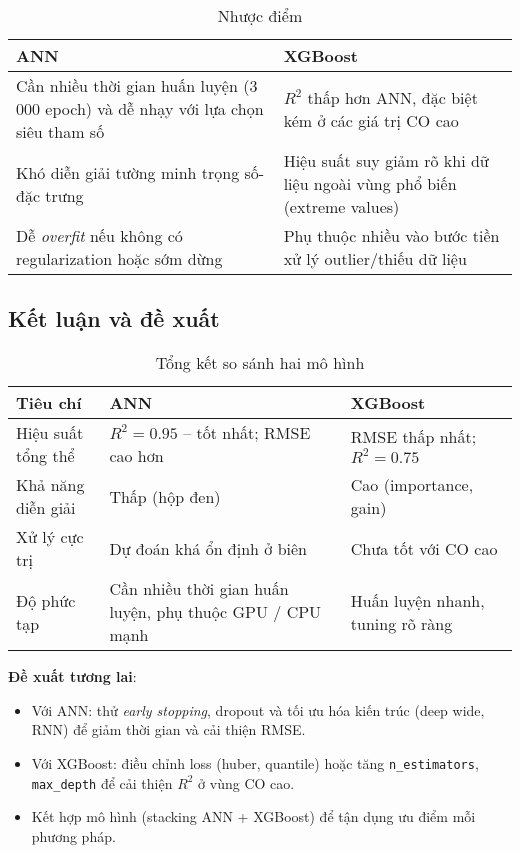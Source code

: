 \begin{table}[h]
\centering
\caption{Nhược điểm}
\begin{tabular}{p{7cm}|p{7cm}}
\toprule
\textbf{ANN} & \textbf{XGBoost} \\
\midrule
Cần nhiều thời gian huấn luyện (3 000 epoch) và dễ nhạy với lựa chọn siêu tham số & $R^{2}$ thấp hơn ANN, đặc biệt kém ở các giá trị CO cao \\
\midrule
Khó diễn giải tường minh trọng số-đặc trưng & Hiệu suất suy giảm rõ khi dữ liệu ngoài vùng phổ biến (extreme values) \\
\midrule
Dễ \emph{overfit} nếu không có regularization hoặc sớm dừng & Phụ thuộc nhiều vào bước tiền xử lý outlier/thiếu dữ liệu \\
\bottomrule
\end{tabular}
\end{table}

\subsection{Kết luận và đề xuất}

\begin{table}[H]
\centering
\caption{Tổng kết so sánh hai mô hình}
\begin{tabular}{p{3cm}|p{5.5cm}|p{5.5cm}}
\toprule
\textbf{Tiêu chí} & \textbf{ANN} & \textbf{XGBoost} \\
\midrule
Hiệu suất tổng thể & $R^{2}=0.95$ – tốt nhất; RMSE cao hơn & RMSE thấp nhất; $R^{2}=0.75$ \\
\midrule
Khả năng diễn giải & Thấp (hộp đen) & Cao (importance, gain) \\
\midrule
Xử lý cực trị & Dự đoán khá ổn định ở biên & Chưa tốt với CO cao \\
\midrule
Độ phức tạp & Cần nhiều thời gian huấn luyện, phụ thuộc GPU / CPU mạnh & Huấn luyện nhanh, tuning rõ ràng \\
\bottomrule
\end{tabular}
\end{table}

\textbf{Đề xuất tương lai}:
\begin{itemize}
  \item Với ANN: thử \emph{early stopping}, dropout và tối ưu hóa kiến trúc (deep wide, RNN) để giảm thời gian và cải thiện RMSE.
  \item Với XGBoost: điều chỉnh loss (huber, quantile) hoặc tăng \texttt{n\_estimators}, \texttt{max\_depth} để cải thiện $R^{2}$ ở vùng CO cao.
  \item Kết hợp mô hình (stacking ANN + XGBoost) để tận dụng ưu điểm mỗi phương pháp.
\end{itemize}